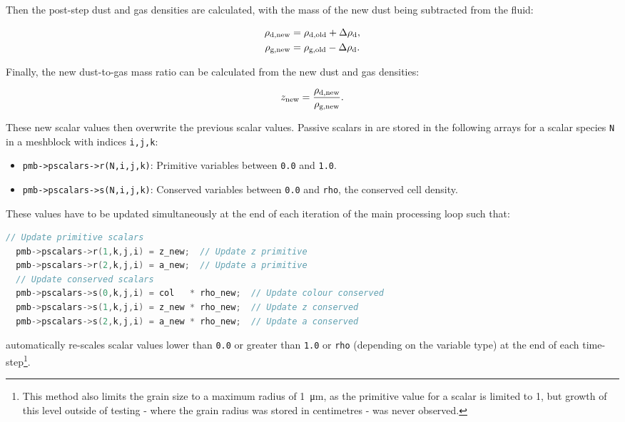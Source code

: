 \noindent
Then the post-step dust and gas densities are calculated, with the mass of the new dust being subtracted from the fluid:

\begin{subequations}
  \begin{align}
    \rho_\text{d,new} & = \rho_\text{d,old} + \Delta \rho_\text{d} , \\
    \rho_\text{g,new} & = \rho_\text{g,old} - \Delta \rho_\text{d} . 
  \end{align}
\end{subequations}

\noindent
Finally, the new dust-to-gas mass ratio can be calculated from the new dust and gas densities:

\begin{equation}
  z_\text{new} = \frac{\rho_\text{d,new}}{\rho_\text{g,new}} . 
\end{equation}

\noindent
These new scalar values then overwrite the previous scalar values.
Passive scalars in \athena{} are stored in the following arrays for a scalar species \texttt{N} in a meshblock with indices \texttt{i,j,k}:

\begin{itemize}
  \item \texttt{pmb->pscalars->r(N,i,j,k)}: Primitive variables between \texttt{0.0} and \texttt{1.0}.
  \item \texttt{pmb->pscalars->s(N,i,j,k)}: Conserved variables between \texttt{0.0} and \texttt{rho}, the conserved cell density.
\end{itemize}

\noindent
These values have to be updated simultaneously at the end of each iteration of the main processing loop such that:

\begin{lstlisting}[language=c++]
  // Update primitive scalars
  pmb->pscalars->r(1,k,j,i) = z_new;  // Update z primitive
  pmb->pscalars->r(2,k,j,i) = a_new;  // Update a primitive
  // Update conserved scalars 
  pmb->pscalars->s(0,k,j,i) = col   * rho_new;  // Update colour conserved
  pmb->pscalars->s(1,k,j,i) = z_new * rho_new;  // Update z conserved
  pmb->pscalars->s(2,k,j,i) = a_new * rho_new;  // Update a conserved
\end{lstlisting}

\noindent
\athena{} automatically re-scales scalar values lower than \texttt{0.0} or greater than \texttt{1.0} or \texttt{rho} (depending on the variable type) at the end of each time-step\footnote{This method also limits the grain size to a maximum radius of \SI{1}{\micro\metre}, as the primitive value for a scalar is limited to 1, but growth of this level outside of testing - where the grain radius was stored in centimetres - was never observed.}.

